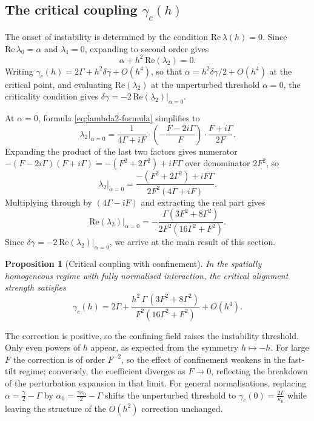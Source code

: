 \documentclass[a4paper,11pt]{article}
\theoremstyle{plain}
\newtheorem{prop}[thm]{Proposition}
\theoremstyle{definition}
\theoremstyle{remark}
\begin{document}
\subsection{The critical coupling $\gamma_c(h)$}\label{subsec:gamma-c}

The onset of instability is determined by the condition $\mathrm{Re}\,\lambda(h) = 0$. Since $\mathrm{Re}\,\lambda_0 = \alpha$ and $\lambda_1 = 0$, expanding to second order gives
\[
    \alpha + h^2\,\mathrm{Re}(\lambda_2) = 0.
\]
Writing $\gamma_c(h) = 2\Gamma + h^2\delta\gamma + O(h^4)$, so that $\alpha = h^2\delta\gamma/2 + O(h^4)$ at the critical point, and evaluating $\mathrm{Re}(\lambda_2)$ at the unperturbed threshold $\alpha = 0$, the criticality condition gives $\delta\gamma = -2\,\mathrm{Re}(\lambda_2)|_{\alpha=0}$.

At $\alpha = 0$, formula \eqref{eq:lambda2-formula} simplifies to
\[
    \lambda_2\big|_{\alpha=0}
    = \frac{1}{4\Gamma + iF}
    \cdot\left(-\frac{F - 2i\Gamma}{F}\right)
    \cdot\frac{F + i\Gamma}{2F}.
\]
Expanding the product of the last two factors gives numerator $-(F - 2i\Gamma)(F + i\Gamma) = -(F^2 + 2\Gamma^2) + iF\Gamma$ over denominator $2F^2$, so
\[
    \lambda_2\big|_{\alpha=0}
    = \frac{-(F^2 + 2\Gamma^2) + iF\Gamma}{2F^2(4\Gamma + iF)}.
\]
Multiplying through by $(4\Gamma - iF)$ and extracting the real part gives
\begin{equation}\label{eq:Re-lambda2}
    \mathrm{Re}(\lambda_2)\big|_{\alpha=0}
    = -\frac{\Gamma(3F^2 + 8\Gamma^2)}{2F^2(16\Gamma^2 + F^2)}.
\end{equation}
Since $\delta\gamma = -2\,\mathrm{Re}(\lambda_2)|_{\alpha=0}$, we arrive at the main result of this section.

\begin{prop}[Critical coupling with confinement]\label{thm:gamma-c}
In the spatially homogeneous regime with fully normalised interaction, the critical alignment strength satisfies
\begin{equation}\label{eq:gamma-c-formula}
    \gamma_c(h) = 2\Gamma
    + \frac{h^2\,\Gamma\,(3F^2 + 8\Gamma^2)}{F^2(16\Gamma^2 + F^2)}
    + O(h^4).
\end{equation}
\end{prop}

The correction is positive, so the confining field raises the instability threshold. Only even powers of $h$ appear, as expected from the symmetry $h \mapsto -h$. For large $F$ the correction is of order $F^{-2}$, so the effect of confinement weakens in the fast-tilt regime; conversely, the coefficient diverges as $F \to 0$, reflecting the breakdown of the perturbation expansion in that limit. For general normalisations, replacing $\alpha = \frac{\gamma}{2} - \Gamma$ by $\alpha_0 = \frac{\gamma\kappa_0}{2} - \Gamma$ shifts the unperturbed threshold to $\gamma_c(0) = \frac{2\Gamma}{\kappa_0}$ while leaving the structure of the $O(h^2)$ correction unchanged.
\end{document}
